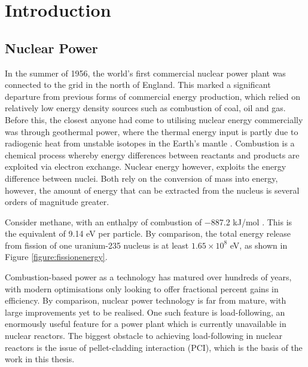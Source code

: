 \chapter{Introduction}

\section{Nuclear Power} %

In the summer of 1956, the world's first commercial nuclear power plant was connected to the grid in the north of England. This marked a significant departure from previous forms of commercial energy production, which relied on relatively low energy density sources such as combustion of coal, oil and gas. Before this, the closest anyone had come to utilising nuclear energy commercially was through geothermal power, where the thermal energy input is partly due to radiogenic heat from unstable isotopes in the Earth's mantle \cite{gando2011partial}. 
Combustion is a chemical process whereby energy differences between reactants and products are exploited via electron exchange. Nuclear energy however, exploits the energy difference between nuclei. Both rely on the conversion of mass into energy, however, the amount of energy that can be extracted from the nucleus is several orders of magnitude greater.

Consider methane, with an enthalpy of combustion of −887.2 kJ/mol \cite{thornton1917xv}. This is the equivalent of 9.14 eV per particle. By comparison, the total energy release from fission of one uranium-235 nucleus is at least $1.65 \times 10^{8}$ eV, as shown in Figure \ref{figure:fissionenergy}.

Combustion-based power as a technology has matured over hundreds of years, with modern optimisations only looking to offer fractional percent gains in efficiency. By comparison, nuclear power technology is far from mature, with large improvements yet to be realised. One such feature is load-following, an enormously useful feature for a power plant which is currently unavailable in nuclear reactors. The biggest obstacle to achieving load-following in nuclear reactors is the issue of pellet-cladding interaction (PCI), which is the basis of the work in this thesis.

